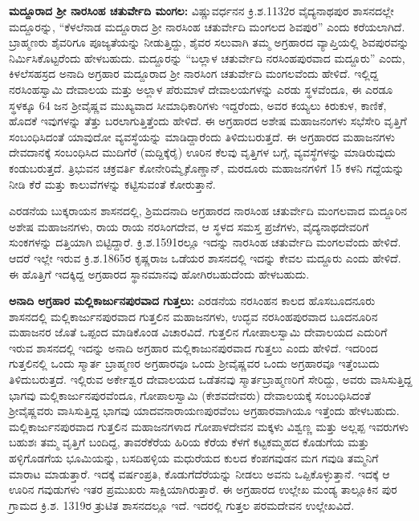 \textbf{ಮದ್ದೂರಾದ ಶ‍್ರೀ ನಾರಸಿಂಹ ಚತುರ್ವೇದಿ ಮಂಗಲ:} ವಿಷ್ಣುವರ್ಧನನ ಕ್ರಿ.ಶ.1132ರ ವೈದ್ಯನಾಥಪುರ ಶಾಸನದಲ್ಲೇ ಮದ್ದೂರನ್ನು, “ಕೆಳಲೆನಾಡ ಮದ್ದೂರಾದ ಶ‍್ರೀ ನಾರಸಿಂಹ ಚತುರ್ವೇದಿ ಮಂಗಲದ ಶಿವಪುರ” ಎಂದು ಕರೆಯಲಾಗಿದೆ. ಬ್ರಾಹ್ಮಣರು ಶೈವರಿಗೂ ಪೂಜ್ಯತೆಯನ್ನು ನೀಡುತ್ತಿದ್ದು, ಶೈವರ ಸಲುವಾಗಿ ತಮ್ಮ ಅಗ್ರಹಾರದ ವ್ಯಾಪ್ತಿಯಲ್ಲಿ ಶಿವಪುರವನ್ನು ನಿರ್ಮಿಸಿಕೊಟ್ಟರೆಂದು ಹೇಳಬಹುದು. ಮದ್ದೂರನ್ನು “ಬಲ್ಲಾಳ ಚತುರ್ವೇದಿ ನರಸಿಂಹಪುರವಾದ ಮದ್ದೂರು” ಎಂದು,  ಕಿಳಲೆಸಹಸ್ರದ ಅನಾದಿ ಅಗ್ರಹಾರ ಮದ್ದೂರಾದ ಶ‍್ರೀ ನಾರಸಿಂಗ ಚತುರ್ವೇದಿ ಮಂಗಲವೆಂದು ಹೇಳಿದೆ. ಇಲ್ಲಿದ್ದ ನರಸಿಂಹಸ್ವಾಮಿ ದೇವಾಲಯ ಮತ್ತು ಅಲ್ಲಾಳ ಪೆರುಮಾಳೆ ದೇವಾಲಯಗಳನ್ನು ಎರಡು ಸ್ಥಳವೆಂದೂ, ಈ ಎರಡೂ ಸ್ಥಳಕ್ಕೂ 64 ಜನ ಶ‍್ರೀವೈಷ್ಣವ ಮುಖ್ಯವಾದ ಸೀಮಾಧಿಕಾರಿಗಳು ಇದ್ದರೆಂದು, ಅವರ ಕಯ್ಯಲು ಕಿರುಕುಳ, ಕಾಣಿಕೆ, ಹೊದಕೆ ಇವುಗಳನ್ನು ತೆತ್ತು ಬರಲಾಗುತ್ತಿತ್ತೆಂದು ಹೇಳಿದೆ. ಈ ಅಗ್ರಹಾರದ ಅಶೇಷ ಮಹಾಜನಂಗಳು ಸಭೆಸೇರಿ ವೃತ್ತಿಗೆ ಸಂಬಂಧಿಸಿದಂತೆ ಯಾವುದೋ ವ್ಯವಸ್ಥೆಯನ್ನು ಮಾಡಿದ್ದಾರೆಂದು ತಿಳಿದುಬರುತ್ತದೆ. ಈ ಅಗ್ರಹಾರದ ಮಹಾಜನಗಳು ದೇವದಾನಕ್ಕೆ ಸಂಬಂಧಿಸಿದ ಮುದಿಗೆರೆ (ಮದ್ದಿಕ್ಕೆರೈ) ಊರಿನ ಕೆಲವು ವೃತ್ತಿಗಳ ಬಗ್ಗೆ, ವ್ಯವಸ್ಥೆಗಳನ್ನು ಮಾಡಿರುವುದು ಕಂಡುಬರುತ್ತದೆ. ತ್ರಿಭುವನ ಚಕ್ರವರ್ತಿ ಕೋನೇರಿಮ್ಮೈಕೊಣ್ಡಾನ್​, ಮರದೂರು ಮಹಾಜನಗಳಿಗೆ 15 ಕಳನಿ ಗದ್ದೆಯನ್ನು ನೀಡಿ ಕೆರೆ ಮತ್ತು ಕಾಲುವೆಗಳನ್ನು ಕಟ್ಟಿಸುವಂತೆ ಕೋರುತ್ತಾನೆ.

ಎರಡನೆಯ ಬುಕ್ಕರಾಯನ ಶಾಸನದಲ್ಲಿ, ಶ್ರಿಮದನಾದಿ ಅಗ್ರಹಾರದ ನಾರಸಿಂಹ ಚತುರ್ವೇದಿ ಮಂಗಲವಾದ ಮದ್ದೂರಿನ ಅಶೇಷ ಮಹಾಜನಗಳು, ರಾಯ ರಾಯ ನರಸಿಂಗದೇವ, ಆ ಸ್ಥಳದ ಸಮಸ್ತ ಪ್ರಜೆಗಳು, ವೈದ್ಯನಾಥದೇವರಿಗೆ ಸುಂಕಗಳನ್ನು ದತ್ತಿಯಾಗಿ ಬಿಟ್ಟಿದ್ದಾರೆ. ಕ್ರಿ.ಶ.1591ರಲ್ಲೂ ಇದನ್ನು ನಾರಸಿಂಹ ಚತುರ್ವೇದಿ ಮಂಗಲವೆಂದು ಹೇಳಿದೆ. ಆದರೆ ಇಲ್ಲೇ ಇರುವ ಕ್ರಿ.ಶ.1865ರ ಕೃಷ್ಣರಾಜ ಒಡೆಯರ ಶಾಸನದಲ್ಲಿ ಇದನ್ನು ಕೇವಲ ಮದ್ದೂರು ಎಂದು ಹೇಳಿದೆ. ಈ ಹೊತ್ತಿಗೆ ಇದಕ್ಕಿದ್ದ ಅಗ್ರಹಾರದ ಸ್ಥಾನಮಾನವು ಹೋಗಿರಬಹುದೆಂದು ಹೇಳಬಹುದು.

\textbf{ಅನಾದಿ ಅಗ್ರಹಾರ ಮಲ್ಲಿಕಾರ್ಜುನಪುರವಾದ ಗುತ್ತಲು:} ಎರಡನೆಯ ನರಸಿಂಹನ ಕಾಲದ ಹೊಸಬೂದನೂರು ಶಾಸನದಲ್ಲಿ ಮಲ್ಲಿಕಾರ್ಜುನಪುರವಾದ ಗುತ್ತಲಿನ ಮಹಾಜನಗಳು, ಉದ್ಭವ ನರಸಿಂಹಪುರವಾದ ಬೂದನೂರಿನ ಮಹಾಜನರ ಜೊತೆ ಒಪ್ಪಂದ ಮಾಡಿಕೊಂಡ ವಿಚಾರವಿದೆ. ಗುತ್ತಲಿನ ಗೋಪಾಲಸ್ವಾಮಿ ದೇವಾಲಯದ ಎದುರಿಗೆ ಇರುವ ಶಾಸನದಲ್ಲಿ ಇದನ್ನು ಅನಾದಿ ಅಗ್ರಹಾರ ಮಲ್ಲಿಕಾಜುನಪುರವಾದ ಗುತ್ತಲು ಎಂದು ಹೇಳಿದೆ. ಇದರಿಂದ ಗುತ್ತಲಿನಲ್ಲಿ ಒಂದು ಸ್ಮಾರ್ತ ಬ್ರಾಹ್ಮಣರ ಅಗ್ರಹಾರವೂ ಒಂದು ಶ‍್ರೀವೈಷ್ಣವರ ಒಂದು ಅಗ್ರಹಾರವೂ ಇತ್ತೆಂಬುದು ತಿಳಿದುಬರುತ್ತದೆ. ಇಲ್ಲಿರುವ ಅರ್ಕೇಶ್ವರ ದೇವಾಲಯದ ಒಡೆತನವು ಸ್ಮಾರ್ತಬ್ರಾಹ್ಮಣರಿಗೆ ಸೇರಿದ್ದು, ಅವರು ವಾಸಿಸುತ್ತಿದ್ದ ಭಾಗವು ಮಲ್ಲಿಕಾರ್ಜುನಪುರವೆಂದೂ, ಗೋಪಾಲಸ್ವಾಮಿ (ಕೇಶವದೇವರು) ದೇವಾಲಯಕ್ಕೆ ಸಂಬಂಧಿಸಿದಂತೆ ಶ‍್ರೀವೈಷ್ಣವರು ವಾಸಿಸುತ್ತಿದ್ದ ಭಾಗವು ಯಾದವನಾರಾಯಣಪುರವೆಂಬ ಅಗ್ರಹಾರವಾಗಿಯೂ ಇತ್ತೆಂದು ಹೇಳಬಹುದು. ಮಲ್ಲಿಕಾರ್ಜುನಪುರವಾದ ಗುತ್ತಲಿನ ಮಹಾಜನಗಳಾದ ಗೋಪಾಳದೇವನ ಮಕ್ಕಳು ವಿಶ್ವಣ್ಣ ಮತ್ತು ಅಲ್ಲಪ್ಪ ಇವರುಗಳು ಬಹುಶಃ ತಮ್ಮ ವೃತ್ತಿಗೆ ಬಂದಿದ್ದ, ತಾವರೆಕೆರೆಯ ಹಿರಿಯ ಕೆರೆಯ ಕೆಳಗೆ ಕಟ್ಟಕಮ್ಮಹದ ಕೊಡುಗೆಯ ಮತ್ತು ಹಳ್ಳಿಗೊಡಗೆಯ ಭೂಮಿಯನ್ನು, ಬಸದಿಹಳ್ಳಿಯ ಮಧುರೆಯದ ಕುಲದ ಕೆಂಪಗವುಡನ ಮಗ ಗವುಡಿ ತಮ್ಮನಿಗೆ ಮಾರಾಟ ಮಾಡುತ್ತಾರೆ. ಇದಕ್ಕೆ ವರ್ಷಂಪ್ರತಿ, ಕೊಡುಗೆದೆರೆಯನ್ನು ನೀಡಲು ಅವನು ಒಪ್ಪಿಕೊಳ್ಳುತ್ತಾನೆ. ಇದಕ್ಕೆ ಆ ಊರಿನ ಗವುಡುಗಳು ಇತರ ಪ್ರಮುಖರು ಸಾಕ್ಷಿಯಾಗಿರುತ್ತಾರೆ. ಈ ಅಗ್ರಹಾರದ ಉಲ್ಲೇಖ ಮಂಡ್ಯ ತಾಲ್ಲೂಕಿನ ಪುರ ಗ್ರಾಮದ ಕ್ರಿ.ಶ. 1319ರ ತ್ರುಟಿತ ಶಾಸನದಲ್ಲೂ ಇದೆ. ಇದರಲ್ಲಿ ಗುತ್ತಲ ಪರಮದೇವನ ಉಲ್ಲೇಖವಿದೆ.

